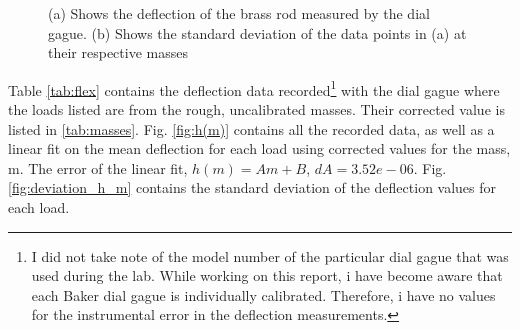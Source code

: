 \documentclass[11pt,a4paper]{article}
\begin{document}
   
    \begin{figure}[H]
      \centering
      \center
      \caption{(a) Shows the deflection of the brass rod measured by the dial gague. (b) Shows the standard deviation of the data points in (a) at their respective masses}
      \label{fig:exp_1}
    \end{figure}

  Table \ref{tab:flex} contains the deflection data recorded\footnote{I did not take note of the model number of the particular dial gague that was used during the lab. While working on this report, i have become aware that each Baker dial gague is individually calibrated. Therefore, i have no values for the instrumental error in the deflection measurements.} with the dial gague where the loads listed are from the rough, uncalibrated masses. Their corrected value is listed in \ref{tab:masses}. 
  \newline
  \newline
  Fig. \ref{fig:h(m)} contains all the recorded data, as well as a linear fit on the mean deflection for each load using corrected values for the mass, m. The error of the linear fit, $h(m) = Am + B$, $dA = 3.52e-06$. Fig. \ref{fig:deviation_h_m} contains the standard deviation of the deflection values for each load.
\end{document}
